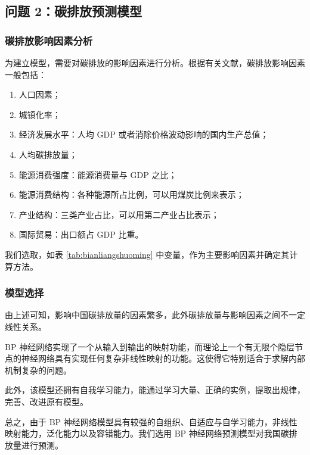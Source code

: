 \subsection{问题 2：碳排放预测模型}

  \subsubsection{碳排放影响因素分析}
    为建立模型，需要对碳排放的影响因素进行分析。根据有关文献，碳排放影响因素一般包括\cite{NCEPU2019}：
    \begin{enumerate}
      \item 人口因素；
      \item 城镇化率；
      \item 经济发展水平：人均 $\mathrm{GDP}$ 或者消除价格波动影响的国内生产总值；
      \item 人均碳排放量；
      \item 能源消费强度：能源消费量与 $\mathrm{GDP}$ 之比；
      \item 能源消费结构：各种能源所占比例，可以用煤炭比例来表示；
      \item 产业结构：三类产业占比，可以用第二产业占比表示；
      \item 国际贸易：出口额占 $\mathrm{GDP}$ 比重。
    \end{enumerate}
    我们选取，如表 \ref{tab:bianliangshuoming} 中变量，作为主要影响因素并确定其计算方法。

  \subsubsection{模型选择}
    由上述可知，影响中国碳排放量的因素繁多，此外碳排放量与影响因素之间不一定线性关系。

    $\mathrm{BP}$ 神经网络实现了一个从输入到输出的映射功能，而理论上一个有无限个隐层节点的神经网络具有实现任何复杂非线性映射的功能。这使得它特别适合于求解内部机制复杂的问题\cite{zhangfaming2016}。

    此外，该模型还拥有自我学习能力，能通过学习大量、正确的实例，提取出规律，完善、改进原有模型。

    总之，由于 $\mathrm{BP}$ 神经网络模型具有较强的自组织、自适应与自学习能力，非线性映射能力，泛化能力以及容错能力\cite{zhoushanshan2018}。我们选用 $\mathrm{BP}$ 神经网络预测模型对我国碳排放量进行预测。

